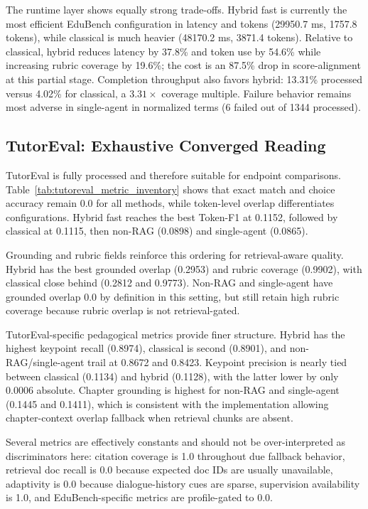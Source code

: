 The runtime layer shows equally strong trade-offs. Hybrid fast is currently the most efficient EduBench configuration in latency and tokens (29950.7 ms, 1757.8 tokens), while classical is much heavier (48170.2 ms, 3871.4 tokens). Relative to classical, hybrid reduces latency by 37.8\% and token use by 54.6\% while increasing rubric coverage by 19.6\%; the cost is an 87.5\% drop in score-alignment at this partial stage. Completion throughput also favors hybrid: 13.31\% processed versus 4.02\% for classical, a $3.31\times$ coverage multiple. Failure behavior remains most adverse in single-agent in normalized terms (6 failed out of 1344 processed).

\subsection{TutorEval: Exhaustive Converged Reading}
TutorEval is fully processed and therefore suitable for endpoint comparisons. Table~\ref{tab:tutoreval_metric_inventory} shows that exact match and choice accuracy remain 0.0 for all methods, while token-level overlap differentiates configurations. Hybrid fast reaches the best Token-F1 at 0.1152, followed by classical at 0.1115, then non-RAG (0.0898) and single-agent (0.0865).

Grounding and rubric fields reinforce this ordering for retrieval-aware quality. Hybrid has the best grounded overlap (0.2953) and rubric coverage (0.9902), with classical close behind (0.2812 and 0.9773). Non-RAG and single-agent have grounded overlap 0.0 by definition in this setting, but still retain high rubric coverage because rubric overlap is not retrieval-gated.

TutorEval-specific pedagogical metrics provide finer structure. Hybrid has the highest keypoint recall (0.8974), classical is second (0.8901), and non-RAG/single-agent trail at 0.8672 and 0.8423. Keypoint precision is nearly tied between classical (0.1134) and hybrid (0.1128), with the latter lower by only 0.0006 absolute. Chapter grounding is highest for non-RAG and single-agent (0.1445 and 0.1411), which is consistent with the implementation allowing chapter-context overlap fallback when retrieval chunks are absent.

Several metrics are effectively constants and should not be over-interpreted as discriminators here: citation coverage is 1.0 throughout due fallback behavior, retrieval doc recall is 0.0 because expected doc IDs are usually unavailable, adaptivity is 0.0 because dialogue-history cues are sparse, supervision availability is 1.0, and EduBench-specific metrics are profile-gated to 0.0.

